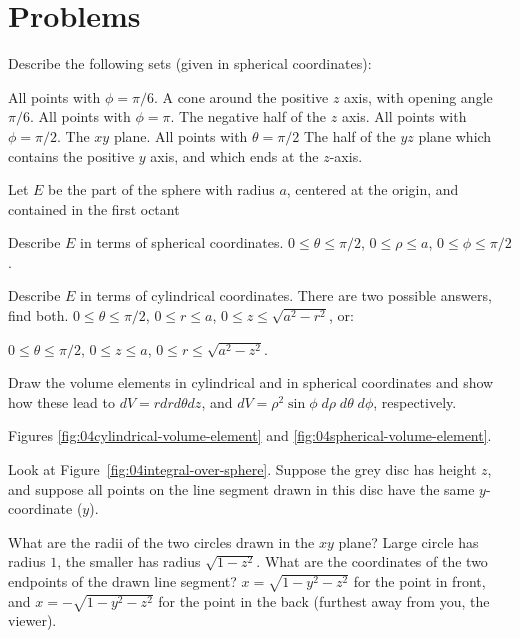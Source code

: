 \section{Problems}  
\problemfont
\begin{multicols}{2}

\problem Describe the following sets  
(given in spherical coordinates):

\subprob All points with $\phi = \pi/6$.
\answer
A cone around the positive $z$ axis, with opening angle $\pi/6.$ 
\endanswer
\subprob All points with $\phi = \pi$.
\answer
The negative half of the $z$ axis.
\endanswer
\subprob All points with $\phi = \pi/2$.
\answer
The $xy$ plane.
\endanswer
\subprob All points with $\theta=\pi/2$ 
\answer
The half of the $yz$ plane which contains the positive $y$ axis, and
which ends at the $z$-axis.
\endanswer

\problem Let $E$ be the part of the sphere with radius $a$, 
centered at the origin, and contained in the first octant

\subprob Describe $E$ in terms of spherical coordinates. 
\answer
$0\leq \theta\le\pi/2$, $0\le \rho\le a$, $0\le\phi\le\pi/2$.
\endanswer

\subprob  Describe $E$ in terms of cylindrical coordinates. 
There are two possible answers, find both.
\answer
$0\le\theta\le\pi/2$, $0\le r\le a$, $0\le z\le \sqrt{a^2-r^2}$, or:

$0\le\theta\le\pi/2$, $0\le z\le a$, $0\le r\le \sqrt{a^2-z^2}$.
\endanswer

\problem Draw the volume elements in cylindrical and in spherical 
coordinates and show how these lead to $dV = rdrd\theta dz$, and
$dV = \rho^2\sin\phi\; d\rho\; d\theta\; d\phi$, respectively.

\answer
Figures \ref{fig:04cylindrical-volume-element} and
\ref{fig:04spherical-volume-element}.
\endanswer

\problem Look at Figure~\ref{fig:04integral-over-sphere}.  
Suppose the grey disc has height $z$, and suppose all points on the
line segment drawn in this disc have the same $y$-coordinate ($y$).

\subprob What are the radii of the two circles drawn in the 
$xy$ plane?
\answer
Large circle has radius $1$, the smaller has radius $\sqrt{1-z^2}$.
\endanswer
\subprob What are the coordinates of the two endpoints of the drawn 
line segment?
\answer
$x=\sqrt{1-y^2-z^2}$ for the point in front, and $x=-\sqrt{1-y^2-z^2}$
for the point in the back (furthest away from you, the viewer).
\endanswer


\end{multicols}
